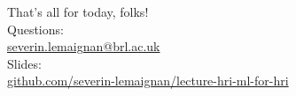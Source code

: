 \documentclass[compress,xcolor=table]{beamer}
\begin{document}
\begin{frame}{}
    \begin{center}
        \Large
        That's all for today, folks!\\[2em]
        \normalsize
        Questions:\\
        \url{severin.lemaignan@brl.ac.uk} \\[1em]

        Slides:\\
        \href{https://github.com/severin-lemaignan/lecture-hri-ml-for-hri}{\small
        github.com/severin-lemaignan/lecture-hri-ml-for-hri}

    \end{center}
\end{frame}
\end{document}
